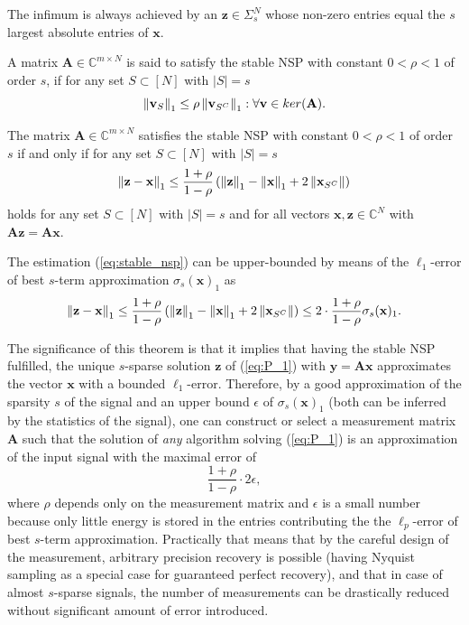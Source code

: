 \begin{remark}
The  infimum is always achieved by an $\mathbf{z} \in \Sigma_s^N$ whose non-zero entries equal the $s$ largest absolute entries of $\mathbf{x}$.
\end{remark}

\begin{definition}
A matrix $\mathbf{A} \in \mathbb{C}^{m \times N}$ is said to satisfy the stable NSP with constant $0 < \rho < 1$ of order $s$, if for any set $S \subset [N]$ with $|S| = s$
\[\left\lVert\mathbf{v}_S\right\rVert_1 \le \rho \left\lVert\mathbf{v}_{S^C}\right\rVert_1 : \forall \mathbf{v} \in ker(\mathbf{A}).\]
\end{definition}

\begin{theorem}
The matrix $\mathbf{A} \in \mathbb{C}^{m \times N}$ satisfies the stable NSP with constant $0 < \rho < 1$ of order $s$ if and only if for any set $S \subset [N]$ with $|S| = s$
\begin{equation}\label{eq:stable_nsp}
    \left\lVert\mathbf{z} - \mathbf{x}\right\rVert_1 \le \frac{1 + \rho}{1 - \rho} \left(\left\lVert\mathbf{z}\right\rVert_1 - \left\lVert\mathbf{x}\right\rVert_1 + 2\left\lVert\mathbf{x}_{S^C}\right\rVert\right)
\end{equation}
holds for any set $S \subset [N]$ with $|S| = s$ and for all vectors $\mathbf{x,z} \in \mathbb{C}^N$ with $\mathbf{Az} = \mathbf{Ax}$.
\end{theorem}

\begin{remark}
The estimation (\ref{eq:stable_nsp}) can be upper-bounded by means of the $\ell_1$-error of best $s$-term approximation $\sigma_s(\mathbf{x})_1$ as
\[\left\lVert\mathbf{z} - \mathbf{x}\right\rVert_1 \le \frac{1 + \rho}{1 - \rho} \left(\left\lVert\mathbf{z}\right\rVert_1 - \left\lVert\mathbf{x}\right\rVert_1 + 2\left\lVert\mathbf{x}_{S^C}\right\rVert\right) \le 2 \cdot \frac{1 + \rho}{1 - \rho}\sigma_s(\mathbf{x})_1.\]
\end{remark}

The significance of this theorem is that it implies that having the stable NSP fulfilled, the unique $s$-sparse solution $\mathbf{z}$ of (\ref{eq:P_1}) with $\mathbf{y} = \mathbf{Ax}$ approximates the vector $\mathbf{x}$ with a bounded $\ell_1$-error. Therefore, by a good approximation of the sparsity $s$ of the signal and an upper bound $\epsilon$ of $\sigma_s(\mathbf{x})_1$ (both can be inferred by the statistics of the signal), one can construct or select a measurement matrix $\mathbf{A}$ such that the solution of \textit{any} algorithm solving (\ref{eq:P_1}) is an approximation of the input signal with the maximal error of
\[\frac{1 + \rho}{1 - \rho} \cdot 2\epsilon,\]
where $\rho$ depends only on the measurement matrix and $\epsilon$ is a small number because only little energy is stored in the entries contributing the the $\ell_p$-error of best $s$-term approximation.
Practically that means that by the careful design of the measurement, arbitrary precision recovery is possible (having Nyquist sampling as a special case for guaranteed perfect recovery), and that in case of almost $s$-sparse signals, the number of measurements can be drastically reduced without significant amount of error introduced.


